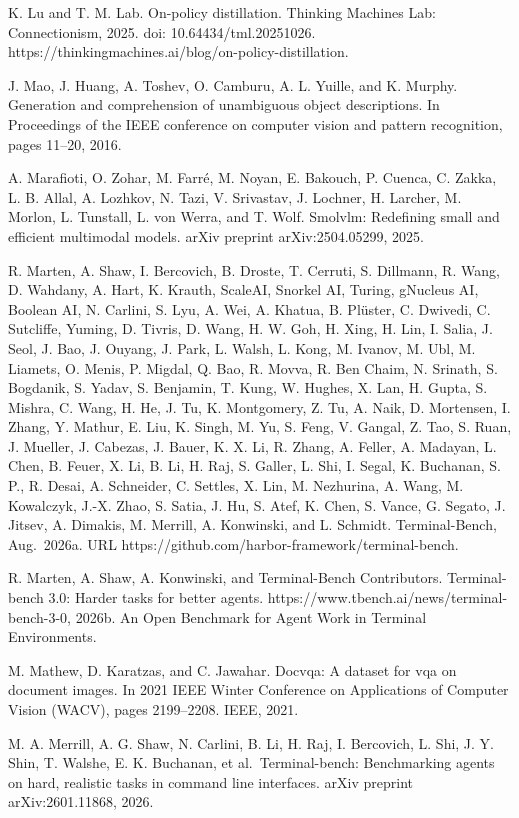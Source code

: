 \documentclass[
  10
]{article}
\begin{document}
K. Lu and T. M. Lab. On-policy distillation. Thinking Machines Lab:
Connectionism, 2025. doi: 10.64434/tml.20251026.
https://thinkingmachines.ai/blog/on-policy-distillation.

J. Mao, J. Huang, A. Toshev, O. Camburu, A. L. Yuille, and K. Murphy.
Generation and comprehension of unambiguous object descriptions. In
Proceedings of the IEEE conference on computer vision and pattern
recognition, pages 11--20, 2016.

A. Marafioti, O. Zohar, M. Farré, M. Noyan, E. Bakouch, P. Cuenca, C.
Zakka, L. B. Allal, A. Lozhkov, N. Tazi, V. Srivastav, J. Lochner, H.
Larcher, M. Morlon, L. Tunstall, L. von Werra, and T. Wolf. Smolvlm:
Redefining small and efficient multimodal models. arXiv preprint
arXiv:2504.05299, 2025.

R. Marten, A. Shaw, I. Bercovich, B. Droste, T. Cerruti, S. Dillmann, R.
Wang, D. Wahdany, A. Hart, K. Krauth, ScaleAI, Snorkel AI, Turing,
gNucleus AI, Boolean AI, N. Carlini, S. Lyu, A. Wei, A. Khatua, B.
Plüster, C. Dwivedi, C. Sutcliffe, Yuming, D. Tivris, D. Wang, H. W.
Goh, H. Xing, H. Lin, I. Salia, J. Seol, J. Bao, J. Ouyang, J. Park, L.
Walsh, L. Kong, M. Ivanov, M. Ubl, M. Liamets, O. Menis, P. Migdal, Q.
Bao, R. Movva, R. Ben Chaim, N. Srinath, S. Bogdanik, S. Yadav, S.
Benjamin, T. Kung, W. Hughes, X. Lan, H. Gupta, S. Mishra, C. Wang, H.
He, J. Tu, K. Montgomery, Z. Tu, A. Naik, D. Mortensen, I. Zhang, Y.
Mathur, E. Liu, K. Singh, M. Yu, S. Feng, V. Gangal, Z. Tao, S. Ruan, J.
Mueller, J. Cabezas, J. Bauer, K. X. Li, R. Zhang, A. Feller, A.
Madayan, L. Chen, B. Feuer, X. Li, B. Li, H. Raj, S. Galler, L. Shi, I.
Segal, K. Buchanan, S. P., R. Desai, A. Schneider, C. Settles, X. Lin,
M. Nezhurina, A. Wang, M. Kowalczyk, J.-X. Zhao, S. Satia, J. Hu, S.
Atef, K. Chen, S. Vance, G. Segato, J. Jitsev, A. Dimakis, M. Merrill,
A. Konwinski, and L. Schmidt. Terminal-Bench, Aug.~2026a. URL
https://github.com/harbor-framework/terminal-bench.

R. Marten, A. Shaw, A. Konwinski, and Terminal-Bench Contributors.
Terminal-bench 3.0: Harder tasks for better agents.
https://www.tbench.ai/news/terminal-bench-3-0, 2026b. An Open Benchmark
for Agent Work in Terminal Environments.

M. Mathew, D. Karatzas, and C. Jawahar. Docvqa: A dataset for vqa on
document images. In 2021 IEEE Winter Conference on Applications of
Computer Vision (WACV), pages 2199--2208. IEEE, 2021.

M. A. Merrill, A. G. Shaw, N. Carlini, B. Li, H. Raj, I. Bercovich, L.
Shi, J. Y. Shin, T. Walshe, E. K. Buchanan, et al.~Terminal-bench:
Benchmarking agents on hard, realistic tasks in command line interfaces.
arXiv preprint arXiv:2601.11868, 2026.
\end{document}
